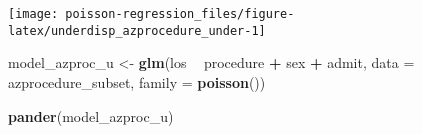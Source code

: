 \documentclass[ngerman,a4paper,]{scrartcl}
\newenvironment{Shaded}{\begin{snugshade}}{\end{snugshade}}
\newcommand{\DataTypeTok}[1]{\textcolor[rgb]{0.13,0.29,0.53}{#1}}
\newcommand{\KeywordTok}[1]{\textcolor[rgb]{0.13,0.29,0.53}{\textbf{#1}}}
\newcommand{\NormalTok}[1]{#1}
\newcommand{\OperatorTok}[1]{\textcolor[rgb]{0.81,0.36,0.00}{\textbf{#1}}}
\newcommand{\StringTok}[1]{\textcolor[rgb]{0.31,0.60,0.02}{#1}}
\theoremstyle{definition}
\theoremstyle{definition}
\theoremstyle{definition}
\theoremstyle{remark}
\begin{document}
\begin{center}\texttt{[image: poisson-regression\_files/figure-latex/underdisp\_azprocedure\_under-1]} \end{center}

\begin{Shaded}
\begin{Highlighting}[]
\NormalTok{model_azproc_u <-}\StringTok{ }\KeywordTok{glm}\NormalTok{(los }\OperatorTok{~}\StringTok{ }\NormalTok{procedure }\OperatorTok{+}\StringTok{ }\NormalTok{sex }\OperatorTok{+}\StringTok{ }\NormalTok{admit, }
                      \DataTypeTok{data =}\NormalTok{ azprocedure_subset, }\DataTypeTok{family =} \KeywordTok{poisson}\NormalTok{())}

\KeywordTok{pander}\NormalTok{(model_azproc_u)}
\end{Highlighting}
\end{Shaded}
\end{document}
